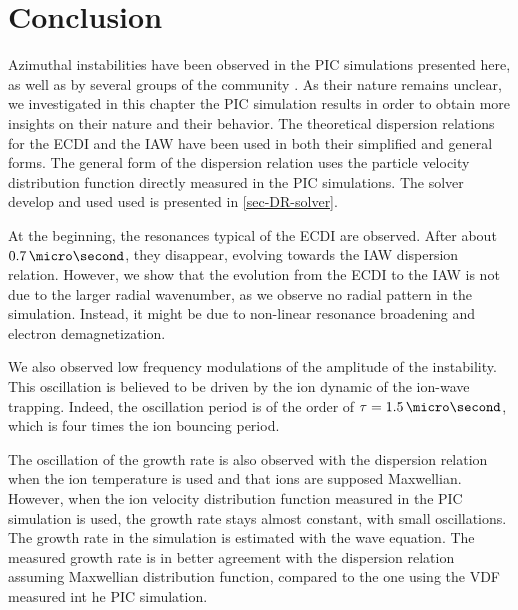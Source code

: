 
\section{Conclusion}
  Azimuthal instabilities have been observed in the \ac{PIC} simulations presented here, as well as by several groups of the community \citep{hara2019a,janhunen2018,taccogna2019}.
  As their nature remains unclear, we investigated in this chapter the \ac{PIC} simulation results in order to obtain more insights on their nature and their behavior.
  The theoretical dispersion relations for the \ac{ECDI} and the \ac{IAW} have been used in both their simplified and general forms.
  The general form of the dispersion relation uses the particle velocity distribution function directly measured in the \ac{PIC} simulations.
  The solver develop and used used is presented in \cref{sec-DR-solver}.
  
  At the beginning, the resonances typical of the \ac{ECDI} are observed.
  After about $0.7\,\micro\second$, they disappear, evolving towards the \ac{IAW} dispersion relation.
  However, we show that the evolution from the \ac{ECDI} to the \ac{IAW}  is not due to the larger radial wavenumber, as we observe no radial pattern in the simulation.
  Instead, it might be due to non-linear resonance broadening and electron demagnetization.
  
  \vspace{1ex}
  We also observed low frequency modulations of the amplitude of the instability.
  This oscillation is believed to be driven by the ion dynamic of the ion-wave trapping.
  Indeed, the oscillation period is of the order of $\tau=1.5\,\micro\second$, which is four times the ion bouncing period.
  
  The oscillation of the growth rate is also observed with the dispersion relation when the ion temperature is used and that ions are supposed Maxwellian.
  However, when the ion velocity distribution function measured in the \ac{PIC}  simulation is used, the growth rate stays almost constant, with small oscillations.
  The growth rate in the simulation is estimated with the wave equation.
  The measured growth rate is in better agreement with the dispersion relation assuming Maxwellian distribution function, compared to the one using the VDF measured int he PIC simulation.
  
